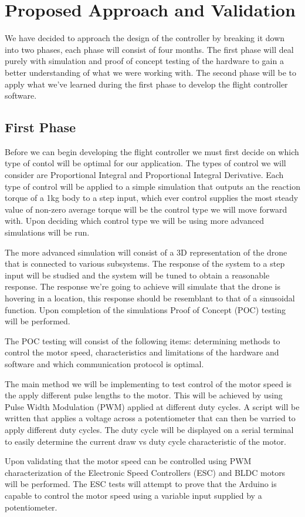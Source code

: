 \section{Proposed Approach and Validation}
We have decided to approach the design of the controller by breaking it down into two phases, each phase will consist of four months. The first phase will deal purely with simulation and proof of concept testing of the hardware to gain a better understanding of what we were working with. The second phase will be to apply what we've learned during the first phase to develop the flight controller software.

\subsection{First Phase}
Before we can begin developing the flight controller we must first decide on which type of contol will be optimal for our application. The types of control we will consider are Proportional Integral and Proportional Integral Derivative. Each type of control will be applied to a simple simulation that outputs an the reaction torque of a 1kg body to a step input, which ever control supplies the most steady value of non-zero average torque will be the control type we will move forward with. Upon deciding which control type we will be using more advanced simulations will be run.

The more advanced simulation will consist of a 3D representation of the drone that is connected to various subsystems. The response of the system to a step input will be studied and the system will be tuned to obtain a reasonable response. The response we're going to achieve will simulate that the drone is hovering in a location, this response should be resemblant to that of a sinusoidal function. Upon completion of the simulations Proof of Concept (POC) testing will be performed. 

The POC testing will consist of the following items: determining methods to control the motor speed, characteristics and limitations of the hardware and software and which communication protocol is optimal. 

The main method we will be implementing to test control of the motor speed is the apply different pulse lengths to the motor. This will be achieved by using Pulse Width Modulation (PWM) applied at different duty cycles. A script will be written that applies a voltage across a potentiometer that can then be varried to apply different duty cycles. The duty cycle will be displayed on a serial terminal to easily determine the current draw vs duty cycle characteristic of the motor. 

Upon validating that the motor speed can be controlled using PWM characterization of the Electronic Speed Controllers (ESC) and BLDC motors will be performed. The ESC tests will attempt to prove that the Arduino is capable to control the motor speed using a variable input supplied by a potentiometer. 


 
